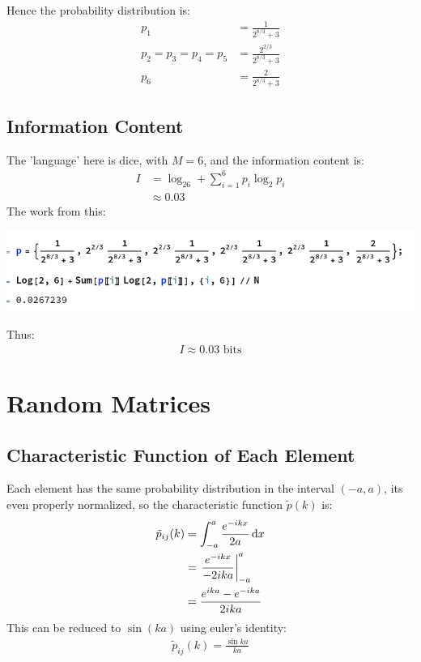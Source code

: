 \documentclass[12pt]{article}
\begin{document}
Hence the probability distribution is:
\begin{equation}
  \boxed{
    \begin{aligned}
      p_1&=\frac1{2^{8/3}+3}\\
      p_2=p_3=p_4=p_5&=\frac{2^{2/3}}{2^{8/3}+3}\\
      p_6&=\frac2{2^{8/3}+3}
    \end{aligned}
  }
\end{equation}

\subsection{Information Content}
The 'language' here is dice, with $M=6$, and the information content is:
\begin{align*}
  I&=\log_26+\sum_{i=1}^{6}p_i\log_2p_i\\
  &\approx 0.03
\end{align*}
The work from this:
\begin{center}
  \includegraphics[width=15.0cm]{work.png}
\end{center}
Thus:
\begin{align}
  \boxed{I\approx 0.03\text{ bits}}
\end{align}
\section{Random Matrices}
\subsection{Characteristic Function of Each Element}
Each element has the same probability distribution in the interval $(-a,a)$, its even properly normalized, so the characteristic function $\tilde{p}(k)$ is:
\begin{align*}
  \tilde{p}_{ij}(k)&=\int_{-a}^a\frac{e^{-ikx}}{2a}\dd{x}\\
  &=\eval{\frac{e^{-ikx}}{-2ika}}_{-a}^a\\
  &=\frac{e^{ika}-e^{-ika}}{2ika}
\end{align*}
This can be reduced to $\sin(ka)$ using euler's identity:
\begin{align}
  \boxed{\tilde{p}_{ij}(k)=\frac{\sin ka}{ka}}
\end{align}
\end{document}
